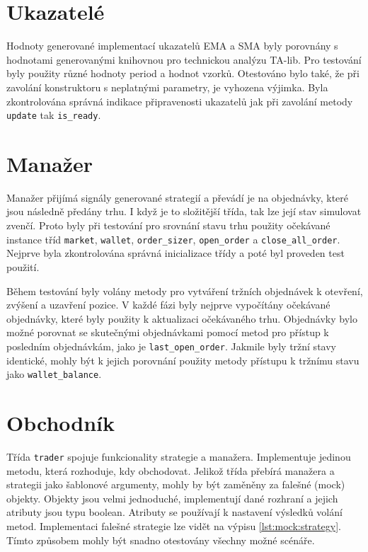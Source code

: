 \section{Ukazatelé}
Hodnoty generované implementací ukazatelů EMA a SMA byly porovnány s hodnotami generovanými knihovnou pro technickou analýzu TA-lib.
Pro testování byly použity různé hodnoty period a hodnot vzorků.
Otestováno bylo také, že při zavolání konstruktoru s neplatnými parametry, je vyhozena výjimka.
Byla zkontrolována správná indikace připravenosti ukazatelů jak při zavolání metody \texttt{update} tak \texttt{is\_ready}.

\section{Manažer}
Manažer přijímá signály generované strategií a převádí je na objednávky, které jsou následně předány trhu.
I když je to složitější třída, tak lze její stav simulovat zvenčí.
Proto byly při testování pro srovnání stavu trhu použity očekávané instance tříd \texttt{market}, \texttt{wallet}, \texttt{order\_sizer}, \texttt{open\_order} a \texttt{close\_all\_order}.
Nejprve byla zkontrolována správná inicializace třídy a poté byl proveden test použití.

Během testování byly volány metody pro vytváření tržních objednávek k otevření, zvýšení a uzavření pozice.
V každé fázi byly nejprve vypočítány očekávané objednávky, které byly použity k aktualizaci očekávaného trhu.
Objednávky bylo možné porovnat se skutečnými objednávkami pomocí metod pro přístup k posledním objednávkám, jako je \texttt{last\_open\_order}.
Jakmile byly tržní stavy identické, mohly být k jejich porovnání použity metody přístupu k tržnímu stavu jako \texttt{wallet\_balance}.

\section{Obchodník}
Třída \texttt{trader} spojuje funkcionality strategie a manažera.
Implementuje jedinou metodu, která rozhoduje, kdy obchodovat.
Jelikož třída přebírá manažera a strategii jako šablonové argumenty, mohly by být zaměněny za falešné (mock) objekty.
Objekty jsou velmi jednoduché, implementují dané rozhraní a jejich atributy jsou typu boolean.
Atributy se používají k nastavení výsledků volání metod.
Implementaci falešné strategie lze vidět na výpisu \ref{lst:mock:strategy}.
Tímto způsobem mohly být snadno otestovány všechny možné scénáře.

